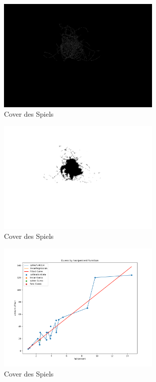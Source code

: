 \documentclass[german,a4paper, 12pt]{scrartcl}
\begin{document}
\begin{figure}
	\centering
	\includegraphics[width=0.7\textwidth]{figBina/09input intensity.png}
	\caption[]{Cover des Spiels}
	\label{img:Bina01}
\end{figure}
\begin{figure}
	\centering
	\includegraphics[width=0.7\textwidth]{figBina/09outer section.png}
	\caption[]{Cover des Spiels}
	\label{img:Bina01}
\end{figure}
\begin{figure}
	\centering
	\includegraphics[width=0.7\textwidth]{figBina/g1.png}
	\caption[]{Cover des Spiels}
	\label{img:Bina01}
\end{figure}
\end{document}
